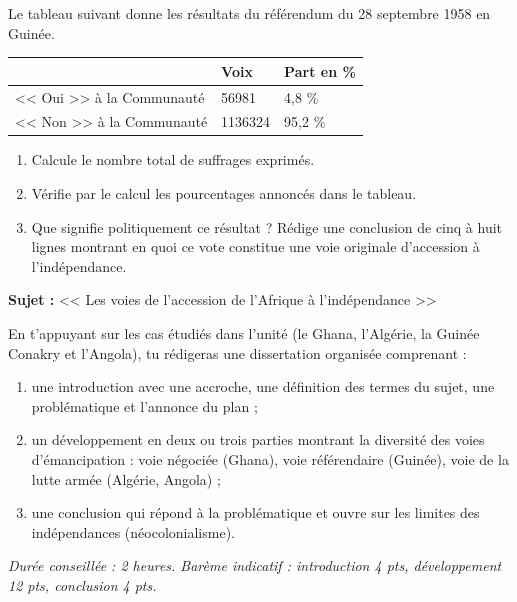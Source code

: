 \documentclass[11pt]{article}
\newcounter{popsec}
\newcounter{popsub}
\newcommand{\courssub}[1]{%
  \stepcounter{popsub}%
  \par\vspace{9pt}\noindent{\popxbold\fontsize{11.5}{13}\selectfont\color{popink}{\color{poporange}\thepopsec.\thepopsub}\hspace{6pt}#1}\par\nopagebreak\vspace{4pt}
}
\begin{document}
\begin{exercice}
Le tableau suivant donne les résultats du référendum du 28 septembre 1958 en Guinée.

\begin{center}
\begin{tabularx}{\linewidth}{|l|X|X|}
\hline
\rowcolor{popblueL} & Voix & Part en \% \\
\hline
<< Oui >> à la Communauté & \num{56981} & 4,8 \% \\
\hline
<< Non >> à la Communauté & \num{1136324} & 95,2 \% \\
\hline
\end{tabularx}
\end{center}

\begin{enumerate}
\item Calcule le nombre total de suffrages exprimés.
\item Vérifie par le calcul les pourcentages annoncés dans le tableau.
\item Que signifie politiquement ce résultat ? Rédige une conclusion de cinq à huit lignes montrant en quoi ce vote constitue une voie originale d'accession à l'indépendance.
\end{enumerate}
\end{exercice}

\courssub{Je me prépare au Bac}

\begin{exercice}
\textbf{Sujet :} << Les voies de l'accession de l'Afrique à l'indépendance >>

En t'appuyant sur les cas étudiés dans l'unité (le Ghana, l'Algérie, la Guinée Conakry et l'Angola), tu rédigeras une dissertation organisée comprenant :
\begin{enumerate}
\item une introduction avec une accroche, une définition des termes du sujet, une problématique et l'annonce du plan ;
\item un développement en deux ou trois parties montrant la diversité des voies d'émancipation : voie négociée (Ghana), voie référendaire (Guinée), voie de la lutte armée (Algérie, Angola) ;
\item une conclusion qui répond à la problématique et ouvre sur les limites des indépendances (néocolonialisme).
\end{enumerate}
\emph{Durée conseillée : 2 heures. Barème indicatif : introduction 4 pts, développement 12 pts, conclusion 4 pts.}
\end{exercice}
\end{document}
